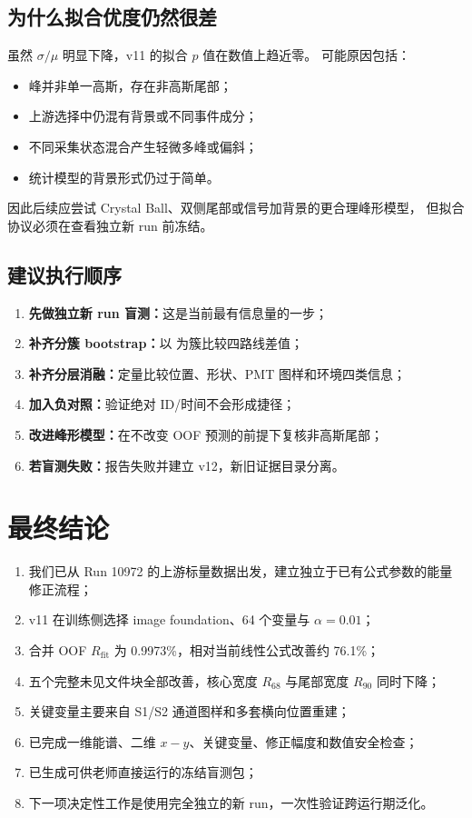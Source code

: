 \documentclass[UTF8,11pt,a4paper,oneside,fontset=none]{ctexart}
\newcommand{\var}[1]{\texttt{\detokenize{#1}}}
\newcommand{\Rfit}{R_{\mathrm{fit}}}
\newcommand{\Rsixtyeight}{R_{68}}
\newcommand{\Rninty}{R_{90}}
\begin{document}
\subsection{为什么拟合优度仍然很差}

虽然 \(\sigma/\mu\) 明显下降，v11 的拟合 \(p\) 值在数值上趋近零。
可能原因包括：
\begin{itemize}
  \item 峰并非单一高斯，存在非高斯尾部；
  \item 上游选择中仍混有背景或不同事件成分；
  \item 不同采集状态混合产生轻微多峰或偏斜；
  \item 统计模型的背景形式仍过于简单。
\end{itemize}
因此后续应尝试 Crystal Ball、双侧尾部或信号加背景的更合理峰形模型，
但拟合协议必须在查看独立新 run 前冻结。

\subsection{建议执行顺序}

\begin{enumerate}
  \item \textbf{先做独立新 run 盲测：}这是当前最有信息量的一步；
  \item \textbf{补齐分簇 bootstrap：}以 \var{fileNumber} 为簇比较四路线差值；
  \item \textbf{补齐分层消融：}定量比较位置、形状、PMT 图样和环境四类信息；
  \item \textbf{加入负对照：}验证绝对 ID/时间不会形成捷径；
  \item \textbf{改进峰形模型：}在不改变 OOF 预测的前提下复核非高斯尾部；
  \item \textbf{若盲测失败：}报告失败并建立 v12，新旧证据目录分离。
\end{enumerate}

\section{最终结论}

\begin{conclusionbox}
\begin{enumerate}
  \item 我们已从 Run 10972 的上游标量数据出发，建立独立于已有公式参数的能量修正流程；
  \item v11 在训练侧选择 image foundation、64 个变量与 \(\alpha=0.01\)；
  \item 合并 OOF \(\Rfit\) 为 0.9973\%，相对当前线性公式改善约 76.1\%；
  \item 五个完整未见文件块全部改善，核心宽度 \(\Rsixtyeight\) 与尾部宽度
  \(\Rninty\) 同时下降；
  \item 关键变量主要来自 S1/S2 通道图样和多套横向位置重建；
  \item 已完成一维能谱、二维 \(x-y\)、关键变量、修正幅度和数值安全检查；
  \item 已生成可供老师直接运行的冻结盲测包；
  \item 下一项决定性工作是使用完全独立的新 run，一次性验证跨运行期泛化。
\end{enumerate}
\end{conclusionbox}
\end{document}

